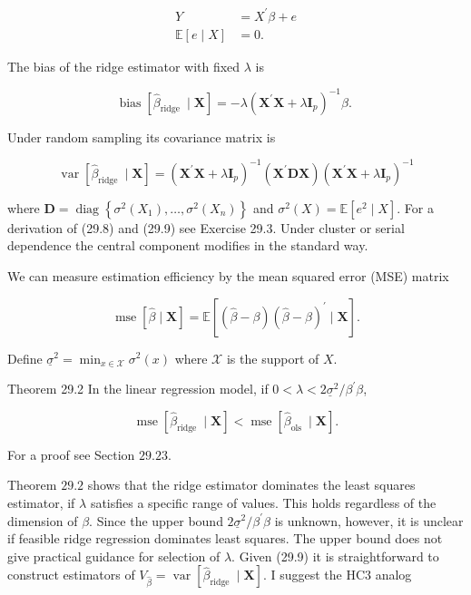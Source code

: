 \documentclass[10pt]{article}
\begin{document}
$$
\begin{aligned}
Y &=X^{\prime} \beta+e \\
\mathbb{E}[e \mid X] &=0 .
\end{aligned}
$$

The bias of the ridge estimator with fixed $\lambda$ is

$$
\operatorname{bias}\left[\widehat{\beta}_{\text {ridge }} \mid \boldsymbol{X}\right]=-\lambda\left(\boldsymbol{X}^{\prime} \boldsymbol{X}+\lambda \boldsymbol{I}_{p}\right)^{-1} \beta \text {. }
$$

Under random sampling its covariance matrix is

$$
\operatorname{var}\left[\widehat{\beta}_{\text {ridge }} \mid \boldsymbol{X}\right]=\left(\boldsymbol{X}^{\prime} \boldsymbol{X}+\lambda \boldsymbol{I}_{p}\right)^{-1}\left(\boldsymbol{X}^{\prime} \boldsymbol{D} \boldsymbol{X}\right)\left(\boldsymbol{X}^{\prime} \boldsymbol{X}+\lambda \boldsymbol{I}_{p}\right)^{-1}
$$

where $\boldsymbol{D}=\operatorname{diag}\left\{\sigma^{2}\left(X_{1}\right), \ldots, \sigma^{2}\left(X_{n}\right)\right\}$ and $\sigma^{2}(X)=\mathbb{E}\left[e^{2} \mid X\right]$. For a derivation of (29.8) and (29.9) see Exercise 29.3. Under cluster or serial dependence the central component modifies in the standard way.

We can measure estimation efficiency by the mean squared error (MSE) matrix

$$
\operatorname{mse}[\widehat{\beta} \mid \boldsymbol{X}]=\mathbb{E}\left[(\widehat{\beta}-\beta)(\widehat{\beta}-\beta)^{\prime} \mid \boldsymbol{X}\right] .
$$

Define $\underline{\sigma}^{2}=\min _{x \in \mathscr{X}} \sigma^{2}(x)$ where $\mathscr{X}$ is the support of $X$.

Theorem 29.2 In the linear regression model, if $0<\lambda<2 \underline{\sigma}^{2} / \beta^{\prime} \beta$,

$$
\operatorname{mse}\left[\widehat{\beta}_{\text {ridge }} \mid \boldsymbol{X}\right]<\operatorname{mse}\left[\widehat{\beta}_{\text {ols }} \mid \boldsymbol{X}\right] .
$$

For a proof see Section $29.23$.

Theorem $29.2$ shows that the ridge estimator dominates the least squares estimator, if $\lambda$ satisfies a specific range of values. This holds regardless of the dimension of $\beta$. Since the upper bound $2 \underline{\sigma}^{2} / \beta^{\prime} \beta$ is unknown, however, it is unclear if feasible ridge regression dominates least squares. The upper bound does not give practical guidance for selection of $\lambda$. Given (29.9) it is straightforward to construct estimators of $V_{\widehat{\beta}}=\operatorname{var}\left[\widehat{\beta}_{\text {ridge }} \mid \boldsymbol{X}\right]$. I suggest the HC3 analog
\end{document}
